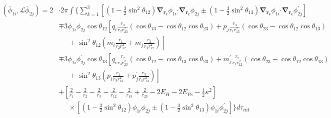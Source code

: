 \documentclass[Dissertation.tex]{subfiles}
\begin{document}
\begin{align}
\label{eq:DWavePhi1Phi2}
\left(\bar{\phi}_{1i},\mathcal{L} \bar{\phi}_{2j}\right) = 2 & \cdot 2\pi \int \Bigg\{ \sum_{k=1}^3 \left[ \left(1-\tfrac{3}{2}\sin^2\theta_{12}\right) \boldsymbol{\nabla}_{\!\mathbf{r}_k} \nonumber \phi_{1i} \boldsymbol{\cdot} \boldsymbol{\nabla}_{\!\mathbf{r}_k} \phi_{2j} \pm \left(1-\tfrac{3}{2}\sin^2\theta_{13}\right) \boldsymbol{\nabla}_{\!\mathbf{r}_k} \phi_{1i} \boldsymbol{\cdot} \boldsymbol{\nabla}_{\!\mathbf{r}_k} \phi_{2j}^\prime \right] \\
 \nonumber &\mp 3 \phi_{1i} \phi_{2j} \cos\theta_{12} \left[q_i \frac{r_3}{r_2 r_{23}^2} (\cos\theta_{13} - \cos\theta_{12} \cos\theta_{23}) + p_j \frac{r_3}{r_1 r_{13}^2}(\cos\theta_{23} - \cos\theta_{12} \cos\theta_{13})\right.\\
 \nonumber & \left. \;\;\;\;\;  + \sin^2\theta_{12} \left(m_i \frac{r_1}{r_2 r_{12}^2} + m_j \frac{r_2}{r_1 r_{12}^2} \right) \right] \\
 \nonumber &\mp 3 \phi_{1i} \phi_{2j}^\prime \cos\theta_{13} \left[q_i \frac{r_2}{r_3 r_{23}^2} (\cos\theta_{12} - \cos\theta_{13} \cos\theta_{23}) + m_j^\prime \frac{r_2}{r_1 r_{12}^2}(\cos\theta_{23} - \cos\theta_{12} \cos\theta_{13})\right.\\
 \nonumber & \left. \;\;\;\;\;  + \sin^2\theta_{13} \left(p_i \frac{r_1}{r_3 r_{13}^2} + p_j^\prime \frac{r_3}{r_1 r_{13}^2} \right) \right] \\
 \nonumber &+ \left. \left[\frac{2}{r_1} - \frac{2}{r_2} - \frac{2}{r_3} - \frac{2}{r_{12}} - \frac{2}{r_{13}} + \frac{2}{r_{23}} - 2 E_H - 2 E_{Ps} - \frac{1}{2}\kappa^2 \right] \right. \\
 &\;\;\;\;\; \times \left[\left(1-\tfrac{3}{2}\sin^2\theta_{12}\right) \phi_{1i} \phi_{2j} \pm \left(1-\tfrac{3}{2}\sin^2\theta_{13}\right) \phi_{1i} \phi_{2j}^\prime \right] \Bigg\} d\tau_{int}
\end{align}
\end{document}
